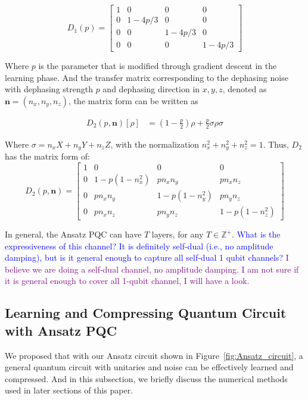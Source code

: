 \documentclass[%
 reprint,
superscriptaddress,
 amsmath,amssymb,
 aps,
]{revtex4-2}
\newcommand{\yijian}[1]{\textcolor{blue}{#1}}
\newcommand{\simba}[1]{\textcolor{purple}{#1}}
\begin{document}
\begin{equation}
    D_1(p) = \begin{bmatrix}
        1 &0 & 0 & 0 \\
        0 & 1-4p/3 & 0 & 0\\
        0  & 0 & 1-4p/3 & 0 \\
        0  & 0 & 0 & 1-4p/3
    \end{bmatrix}
    \label{eq:Depolarizing_D_1}
\end{equation}

Where $p$ is the parameter that is modified through gradient descent in the learning phase. And the transfer matrix corresponding to the dephasing noise with dephasing strength $p$ and dephasing direction in $x, y, z$, denoted as $\mathbf{n}=(n_x, n_y, n_z)$, the matrix form can be written as

\begin{equation}
\begin{split}
    D_2(p, \mathbf{n})[\rho] &= \left(1-\frac{p}{2}\right)\rho + \frac{p}{2}\sigma \rho\sigma
\end{split}
\end{equation}

Where $\sigma = n_xX+n_yY+n_zZ$, with the normalization $n_x^2+n_y^2+n_z^2 = 1$. Thus, $D_2$ has the matrix form of:
\begin{equation}
D_2(p, \mathbf{n}) = \begin{bmatrix}
1 & 0 & 0 & 0 \\
0 & 1 - p(1 - n_x^2) & p n_x n_y & p n_x n_z \\
0 & p n_x n_y & 1 - p(1 - n_y^2) & p n_y n_z \\
0 & p n_x n_z & p n_y n_z & 1 - p(1 - n_z^2)
\end{bmatrix}
\end{equation}

In general, the Ansatz PQC can have $T$ layers, for any $T\in \mathbb{Z}^+$. \yijian{What is the expressiveness of this channel? It is definitely self-dual (i.e., no amplitude damping), but is it general enough to capture all self-dual 1 qubit channels?}
\simba{I believe we are doing a self-dual channel, no amplitude damping. I am not sure if it is general enough to cover all 1-qubit channel, I will have a look.}

\subsection{Learning and Compressing Quantum Circuit with Ansatz PQC}
We proposed that with our Ansatz circuit shown in Figure~\ref{fig:Ansatz_circuit}, a general quantum circuit with unitaries and noise can be effectively learned and compressed. And in this subsection, we briefly discuss the numerical methods used in later sections of this paper.
\end{document}
